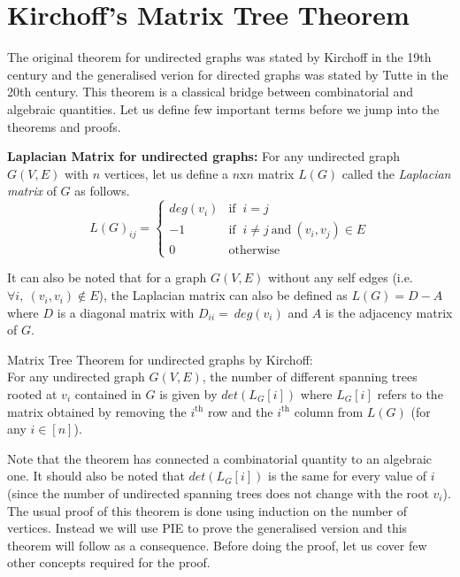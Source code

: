 \section{Kirchoff’s Matrix Tree Theorem} \label{sec:kirchoff's application}
The original theorem for undirected graphs was stated by Kirchoff in the 19th century and the generalised verion for directed graphs was stated by Tutte in the 20th century. This theorem is a classical bridge between combinatorial and algebraic quantities. Let us define few important terms before we jump into the theorems and proofs.\\
\begin{definition}\textbf{Laplacian Matrix for undirected graphs:} 
For any undirected graph $G(V,E)$ with $n$ vertices, let us define a $n$x$n$ matrix $L(G)$ called the \textit{Laplacian matrix} of $G$ as follows.
\[
  L(G)_{ij} = 
  \begin{cases}
    deg(v_i) &\mbox{if }~ i = j\\
    -1 &\mbox{if }~ i \neq j ~\text{and}~(v_i,v_j)\in E\\
    0 &\mbox{otherwise}
  \end{cases}
\]
\end{definition}
It can also be noted that for a graph $G(V,E)$ without any self edges (i.e. $\forall i, ~ (v_i,v_i) \notin E$), the Laplacian matrix can also be defined as $L(G) = D - A$ where $D$ is a diagonal matrix with $D_{ii} = ~deg(v_i)$ and $A$ is the adjacency matrix of $G$.
\begin{theorem} Matrix Tree Theorem for undirected graphs by Kirchoff:\\
For any undirected graph $G(V,E)$, the number of different spanning trees rooted at $v_i$ contained in $G$ is given by $det(L_G[i])$ where $L_G[i]$ refers to the matrix obtained by removing the $i^{\text{th}}$ row and the $i^{\text{th}}$ column from $L(G)$ (for any $i \in [n]$).
\end{theorem}
\noindent
Note that the theorem has connected a combinatorial quantity to an algebraic one. It should also be noted that $det(L_G[i])$ is the same for every value of $i$ (since the number of undirected spanning trees does not change with the root $v_i$). The usual proof of this theorem is done using induction on the number of vertices. Instead we will use PIE to prove the generalised version and this theorem will follow as a consequence. Before doing the proof, let us cover few other concepts required for the proof.\\
